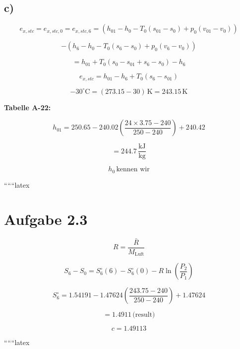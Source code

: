 

\subsection*{c)}

\[
e_{x,stc} = e_{x,stc,0} = e_{x,stc,6} = (h_{01} - h_0 - T_0 (s_{01} - s_0) + p_0 (v_{01} - v_0))
\]

\[
- (h_6 - h_0 - T_0 (s_6 - s_0) + p_0 (v_6 - v_0))
\]

\[
= h_{01} + T_0 (s_0 - s_{01} + s_6 - s_0) - h_6
\]

\[
e_{x,stc} = h_{01} - h_6 + T_0 (s_6 - s_{01})
\]

\[
-30^\circ \text{C} = (273.15 - 30) \, \text{K} = 243.15 \, \text{K}
\]

\textbf{Tabelle A-22:}

\[
h_{01} = 250.65 - 240.02 \left( \frac{24 \times 3.75 - 240}{250 - 240} \right) + 240.42
\]

\[
= 244.7 \, \frac{\text{kJ}}{\text{kg}}
\]

\[
h_0 \, \text{kennen wir}
\]

``````latex


\section*{Aufgabe 2.3}

\[
R = \frac{\bar{R}}{M_{\text{Luft}}}
\]

\[
S_6 - S_0 = S_6^\circ (6) - S_6^\circ (0) - R \ln \left( \frac{P_2}{P_1} \right)
\]


\[
S_6^\circ = 1.54191 - 1.47624 \left( \frac{243.75 - 240}{250 - 240} \right) + 1.47624
\]

\[
= 1.4911 \, \text{(result)}
\]

\[
c = 1.49113
\]

``````latex